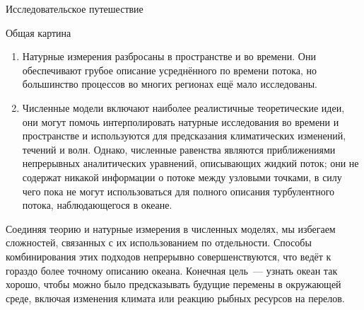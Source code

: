 \begin{chapter}{Исследовательское путешествие}
\begin{section}{Общая картина}
\begin{enumerate}
\item
Натурные измерения разбросаны в пространстве и во времени. Они обеспечивают 
грубое описание усреднённого по времени потока, но большинство процессов 
во многих регионах ещё мало исследованы.
%

\item
Численные модели включают наиболее реалистичные теоретические идеи, они могут 
помочь интерполировать натурные исследования во времени и пространстве 
и используются для предсказания климатических изменений, течений и волн. 
Однако, численные равенства являются приближениями непрерывных аналитических 
уравнений, описывающих жидкий поток; они не содержат никакой информации о 
потоке между узловыми точками, в силу чего пока не могут использоваться 
для полного описания турбулентного потока, наблюдающегося в океане. 
%
\end{enumerate}

Соединяя теорию и натурные измерения в численных моделях, мы избегаем 
сложностей, связанных с их использованием по отдельности. Способы комбинирования
этих подходов непрерывно совершенствуются, что ведёт к гораздо 
более точному описанию океана. Конечная цель~--- узнать океан так хорошо, 
чтобы можно было предсказывать будущие перемены в окружающей среде, 
включая изменения климата или реакцию рыбных ресурсов на перелов.
%


\end{section}
\end{chapter}
